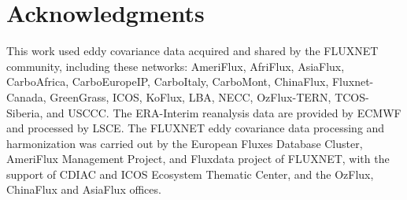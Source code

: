 \documentclass[utf8]{frontiersSCNS} %
\begin{document}
\section*{Acknowledgments}
This work used eddy covariance data acquired and shared by the FLUXNET community, including these networks: AmeriFlux, AfriFlux, AsiaFlux, CarboAfrica, CarboEuropeIP, CarboItaly, CarboMont, ChinaFlux, Fluxnet-Canada, GreenGrass, ICOS, KoFlux, LBA, NECC, OzFlux-TERN, TCOS-Siberia, and USCCC. The ERA-Interim reanalysis data are provided by ECMWF and processed by LSCE. The FLUXNET eddy covariance data processing and harmonization was carried out by the European Fluxes Database Cluster, AmeriFlux Management Project, and Fluxdata project of FLUXNET, with the support of CDIAC and ICOS Ecosystem Thematic Center, and the OzFlux, ChinaFlux and AsiaFlux offices.








\end{document}
